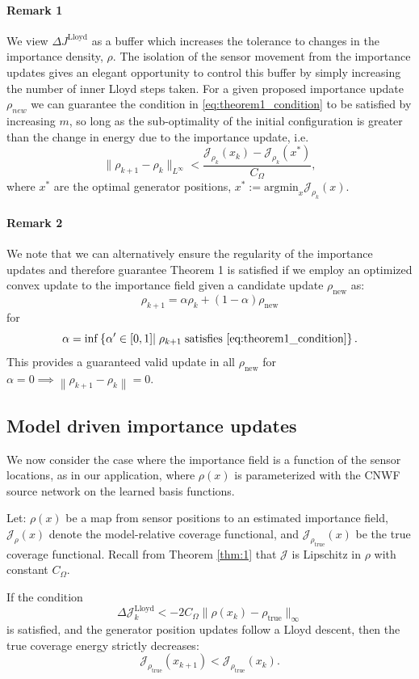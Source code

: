 \documentclass[onefignum,onetabnum]{siamart171218} %
\newcommand{\norm}[1]{\left\lVert#1\right\rVert}
\begin{document}
\paragraph{Remark 1} 
We view $\Delta J^{\mathrm{Lloyd}}$ as a buffer which increases the tolerance to changes in the importance density, $\rho$.
The isolation of the sensor movement from the importance updates gives an elegant opportunity to control this buffer by simply increasing the number of inner Lloyd steps taken.
For a given proposed importance update $\rho_{new}$ we can guarantee the condition in \eqref{eq:theorem1_condition} to be satisfied by increasing $m$, so long as the sub-optimality of the initial configuration is greater than the change in energy due to the importance update, i.e.
\[
    \|\rho_{k+1} - \rho_k\|_{L^\infty} < \frac{\mathcal{J}_{\rho_k}(x_{k}) - \mathcal{J}_{\rho_k}(x^*)}{C_\Omega},
\]
where $x^*$ are the optimal generator positions, \(x^*:=\text{argmin}_x \mathcal{J}_{\rho_k}(x)\).

\paragraph{Remark 2}
\label{rem:gurantee_imp_regularity}
We note that we can alternatively ensure the regularity of the importance updates and therefore guarantee Theorem 1 is satisfied if we employ an optimized convex update to the importance field given a candidate update $\rho_{\mathrm{new}}$ as:
\[
    \rho_{k+1} = \alpha \rho_k + (1-\alpha) \rho_{\mathrm{new}}
\]
for
\[
    \alpha = \inf\left\{\alpha' \in [0,1] | \; \rho_{k+1}\; \text{satisfies \eqref{eq:theorem1_condition}}\right\}.
\]
This provides a guaranteed valid update in all $\rho_{\mathrm{new}}$ for $\alpha=0 \implies \norm{\rho_{k+1} - \rho_k} = 0$.

\subsection{Model driven importance updates}
\label{sec:methodology_model_based}

We now consider the case where the importance field is a function of the sensor locations, as in our application, where \(\rho(x)\) is parameterized with the CNWF source network on the learned basis functions.


\begin{theorem}
\label{thm:2}
Let: $\rho(x)$ be a map from sensor positions to an estimated importance field,
$\mathcal{J}_{\rho}(x)$ denote the model-relative coverage functional, and $\mathcal{J}_{\rho_{\mathrm{true}}}(x)$ be the true coverage functional. Recall from Theorem \ref{thm:1} that $\mathcal{J}$ is Lipschitz in $\rho$ with constant $C_\Omega$.

If the condition
\[
     \Delta\mathcal{J}_k^{\mathrm{Lloyd}} < 
     -2C_\Omega \|\rho(x_k) - \rho_{\mathrm{true}}\|_\infty
\]
is satisfied, and the generator position updates follow a Lloyd descent,
then the true coverage energy strictly decreases:
\[
    \mathcal{J}_{\rho_{\mathrm{true}}}(x_{k+1}) < \mathcal{J}_{\rho_{\mathrm{true}}}(x_k).
\]
\end{theorem}
\end{document}
